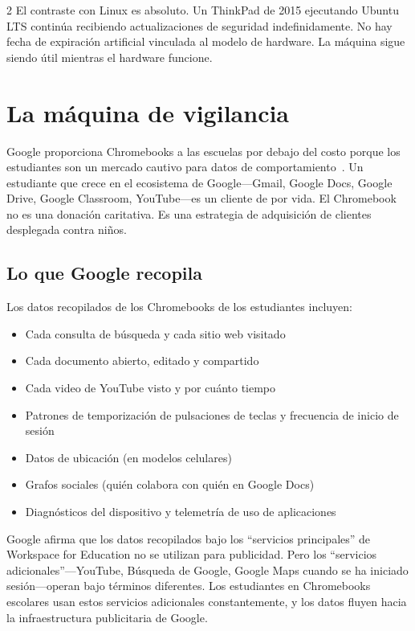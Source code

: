 \documentclass[11pt, a4paper]{article}
\begin{document}
\begin{multicols}{2}
El contraste con Linux es absoluto. Un ThinkPad de 2015 ejecutando Ubuntu LTS continúa recibiendo actualizaciones de seguridad indefinidamente. No hay fecha de expiración artificial vinculada al modelo de hardware. La máquina sigue siendo útil mientras el hardware funcione.


\section{La máquina de vigilancia}
\label{sec:surveillance}

Google proporciona Chromebooks a las escuelas por debajo del costo porque los estudiantes son un mercado cautivo para datos de comportamiento~\citep{zuboff2019surveillance, doctorow2020attack}. Un estudiante que crece en el ecosistema de Google---Gmail, Google Docs, Google Drive, Google Classroom, YouTube---es un cliente de por vida. El Chromebook no es una donación caritativa. Es una estrategia de adquisición de clientes desplegada contra niños.

\subsection{Lo que Google recopila}

Los datos recopilados de los Chromebooks de los estudiantes incluyen:

\begin{itemize}
  \item Cada consulta de búsqueda y cada sitio web visitado
  \item Cada documento abierto, editado y compartido
  \item Cada video de YouTube visto y por cuánto tiempo
  \item Patrones de temporización de pulsaciones de teclas y frecuencia de inicio de sesión
  \item Datos de ubicación (en modelos celulares)
  \item Grafos sociales (quién colabora con quién en Google Docs)
  \item Diagnósticos del dispositivo y telemetría de uso de aplicaciones
\end{itemize}

Google afirma que los datos recopilados bajo los ``servicios principales'' de Workspace for Education no se utilizan para publicidad. Pero los ``servicios adicionales''---YouTube, Búsqueda de Google, Google Maps cuando se ha iniciado sesión---operan bajo términos diferentes. Los estudiantes en Chromebooks escolares usan estos servicios adicionales constantemente, y los datos fluyen hacia la infraestructura publicitaria de Google.


\end{multicols}
\end{document}
